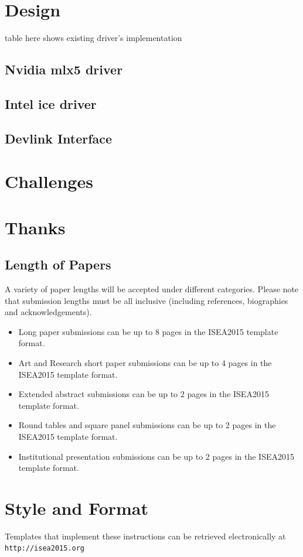 \documentclass[letterpaper]{article}
\begin{document}
\section{Design}
table here shows existing driver's implementation

\subsection{Nvidia mlx5 driver}
\subsection{Intel ice driver}
\subsection{Devlink Interface}

\section{Challenges}
\section{Thanks}

\subsection{Length of Papers}
A variety of paper lengths will be accepted under different categories. Please note that submission lengths must be all inclusive (including references, biographies and acknowledgements).
\begin{itemize}
\item Long paper submissions can be up to 8 pages in the ISEA2015 template format.
\item Art and Research short paper submissions can be up to 4 pages in the ISEA2015 template format.
\item Extended abstract submissions can be up to 2 pages in the ISEA2015 template format.
\item Round tables and square panel submissions can be up to 2 pages in the ISEA2015 template format.
\item Institutional presentation submissions can be up to 2 pages in the ISEA2015 template format.
\end{itemize}

\section{Style and Format}
Templates that implement these instructions can be retrieved electronically at {\small \tt http://isea2015.org}
\end{document}
